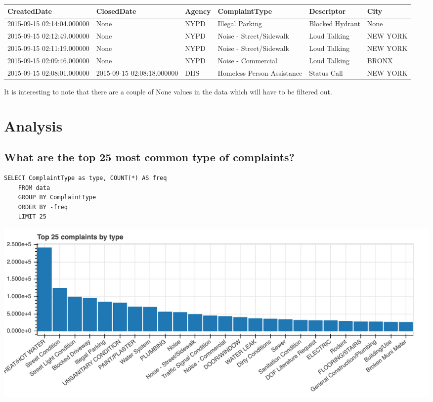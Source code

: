 \documentclass[12pt,a4paper]{article}
\begin{document}
\begin{center}
 \begin{tabular}{||p{3cm} p{3cm} p{1cm} p{3cm} p{3cm} p{1.5cm}||}
 \hline
 CreatedDate & ClosedDate & Agency & ComplaintType & Descriptor & City \\ [0.5ex]
 \hline\hline
 2015-09-15 02:14:04.000000 & None & NYPD & Illegal Parking & Blocked Hydrant & None \\
 \hline
 2015-09-15 02:12:49.000000 & None & NYPD & Noise - Street/Sidewalk & Loud Talking & NEW YORK \\
 \hline
 2015-09-15 02:11:19.000000 & None & NYPD & Noise - Street/Sidewalk & Loud Talking & NEW YORK \\
 \hline
 2015-09-15 02:09:46.000000 & None & NYPD & Noise - Commercial & Loud Talking & BRONX \\
 \hline
 2015-09-15 02:08:01.000000 & 2015-09-15 02:08:18.000000 & DHS & Homeless Person Assistance & Status Call  & NEW YORK \\ [1ex]
 \hline
\end{tabular}
\end{center}

It is interesting to note that there are a couple of None values in the data which will have to be filtered out.

\section{Analysis}
\subsection{What are the top 25 most common type of complaints?}  \label{top25}
\begin{verbatim}
SELECT ComplaintType as type, COUNT(*) AS freq
    FROM data
    GROUP BY ComplaintType
    ORDER BY -freq
    LIMIT 25
\end{verbatim}

\includegraphics[scale=0.3]{top25complaints}
\end{document}
